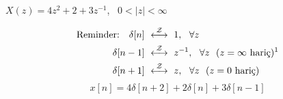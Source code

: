 \documentclass[11pt,a4paper]{article}
\begin{document}
\begin{ornek}[]
  $X(z)=4z^2+2+3z^{-1}$, \ $0<|z|<\infty$
\end{ornek}
\begin{align*}
  \text{Reminder:}\quad \delta[n]\ &\overset{\mathcal{Z}}{\longleftrightarrow}\ 1,\ \ \forall z\\
  \delta[n-1]\ &\overset{\mathcal{Z}}{\longleftrightarrow}\ z^{-1},\ \ \forall z\ \ (z=\infty \text{ hariç})\text{\footnotemark}\\
  \delta[n+1]\ &\overset{\mathcal{Z}}{\longleftrightarrow}\ z,\ \ \forall z\ \ (z=0 \text{ hariç})
\end{align*}
\[ x[n]=4\delta[n+2]+2\delta[n]+3\delta[n-1] \]
\end{document}
